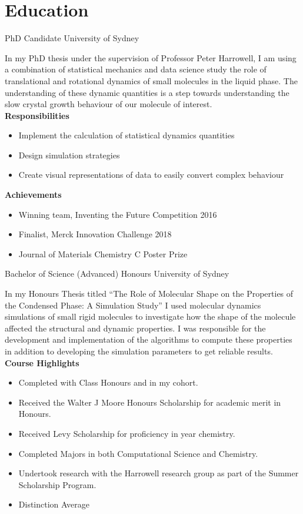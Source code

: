 



\makecvtitle

\vspace{-4em}
\section{Education}

{PhD Candidate}
{University of Sydney}{}{}
{%
In my PhD thesis under the supervision of Professor Peter Harrowell,
I am using a combination of
statistical mechanics and data science
study the role of translational and rotational dynamics
of small molecules in the liquid phase.
The understanding of these dynamic quantities is a step
towards understanding the slow crystal growth behaviour of
our molecule of interest.\\
\textbf{Responsibilities}
\begin{itemize}
  \item Implement the calculation of statistical dynamics quantities
  \item Design simulation strategies
  \item Create visual representations of data to easily convert complex behaviour
\end{itemize}
\textbf{Achievements}
\begin{itemize}
  \item Winning team, Inventing the Future Competition 2016
  \item Finalist, Merck Innovation Challenge 2018
  \item Journal of Materials Chemistry C Poster Prize
\end{itemize}
}

{Bachelor of Science (Advanced) Honours}
{University of Sydney}{}{}
{%
In my Honours Thesis titled
``The Role of Molecular Shape on the Properties of the Condensed Phase: A Simulation Study''
I used molecular dynamics simulations of small rigid molecules to investigate how
the shape of the molecule affected the structural and dynamic properties.
I was responsible for the development and implementation of the algorithms to
compute these properties in addition to developing the simulation parameters
to get reliable results. \\
\textbf{Course Highlights}
\begin{itemize}
  \item Completed with  Class Honours and  in my cohort.
  \item Received the Walter J Moore Honours Scholarship for academic merit in Honours.
  \item Received Levy Scholarship for proficiency in  year chemistry.
  \item Completed Majors in both Computational Science and Chemistry.
  \item Undertook research with the Harrowell research group as part of the Summer Scholarship Program.
  \item Distinction Average
\end{itemize}
}

